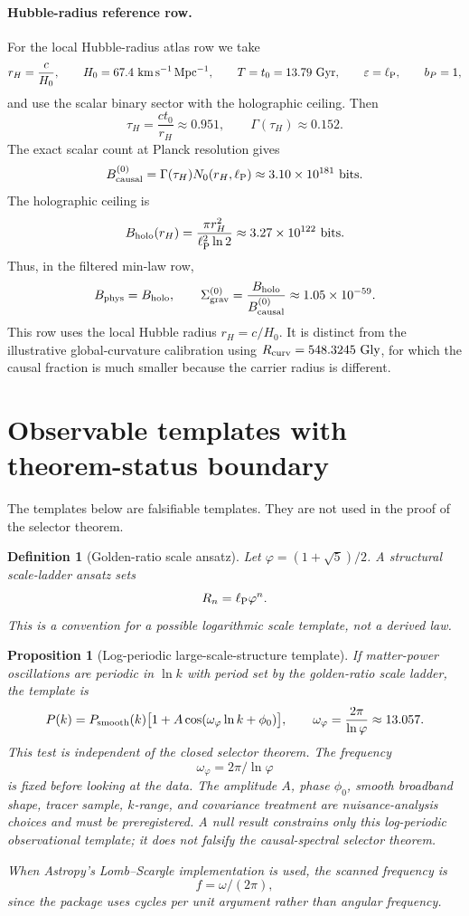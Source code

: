 \documentclass[11pt,a4paper]{article}
\newtheorem{proposition}[theorem]{Proposition}
\newtheorem{definition}[theorem]{Definition}
\newcommand{\ellP}{\ell_{\rm P}}
\begin{document}
\paragraph{Hubble-radius reference row.}
For the local Hubble-radius atlas row we take
\[
r_H=\frac{c}{H_0},\qquad
H_0=67.4\ {\rm km\,s^{-1}\,Mpc^{-1}},\qquad
T=t_0=13.79\ {\rm Gyr},\qquad
\varepsilon=\ellP,\qquad b_P=1,
\]
and use the scalar binary sector with the holographic ceiling.  Then
\[
\tau_H=\frac{ct_0}{r_H}\approx0.951,\qquad
\Gamma(\tau_H)\approx0.152.
\]
The exact scalar count at Planck resolution gives
\[
B_{\rm causal}^{(0)}
=
\Gamma(\tau_H)N_0(r_H,\ellP)
\approx
3.10\times10^{181}\ {\rm bits}.
\]
The holographic ceiling is
\[
B_{\rm holo}(r_H)
=
\frac{\pi r_H^2}{\ellP^2\ln2}
\approx
3.27\times10^{122}\ {\rm bits}.
\]
Thus, in the filtered min-law row,
\[
B_{\rm phys}=B_{\rm holo},\qquad
\Sigma_{\rm grav}^{(0)}
=
\frac{B_{\rm holo}}{B_{\rm causal}^{(0)}}
\approx
1.05\times10^{-59}.
\]
This row uses the local Hubble radius \(r_H=c/H_0\).  It is distinct from the illustrative global-curvature calibration using \(R_{\rm curv}=548.3245\ {\rm Gly}\), for which the causal fraction is much smaller because the carrier radius is different.

\section{Observable templates with theorem-status boundary}
\label{sec:observable-templates}

The templates below are falsifiable templates.  They are not used in the proof of the selector theorem.

\begin{definition}[Golden-ratio scale ansatz]
Let $\varphi=(1+\sqrt5)/2$.  A structural scale-ladder ansatz sets
\[
R_n=\ellP\varphi^n.
\]
This is a convention for a possible logarithmic scale template, not a derived law.
\end{definition}

\begin{proposition}[Log-periodic large-scale-structure template]
If matter-power oscillations are periodic in $\ln k$ with period set by the golden-ratio scale ladder, the template is
\[
P(k)=P_{\rm smooth}(k)\bigl[1+A\cos(\omega_\varphi\ln k+\phi_0)\bigr],
\qquad
\omega_\varphi=\frac{2\pi}{\ln\varphi}\approx13.057.
\]
This test is independent of the closed selector theorem.  The frequency
\[
\omega_\varphi=2\pi/\ln\varphi
\]
is fixed before looking at the data.  The amplitude $A$, phase $\phi_0$, smooth broadband shape, tracer sample, $k$-range, and covariance treatment are nuisance-analysis choices and must be preregistered.  A null result constrains only this log-periodic observational template; it does not falsify the causal-spectral selector theorem.

When Astropy's Lomb--Scargle implementation is used, the scanned frequency is
\[
f=\omega/(2\pi),
\]
since the package uses cycles per unit argument rather than angular frequency.
\end{proposition}
\end{document}
